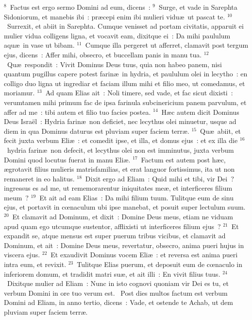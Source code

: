 ${}^{8}$~Factus est ergo sermo Domini ad eum, dicens~:
${}^{9}$~Surge, et vade in Sarephta Sidoniorum, et manebis ibi~: pr\ae cepi enim ibi mulieri vidu\ae\ ut pascat te.
${}^{10}$~Surrexit, et abiit in Sarephta. Cumque venisset ad portam civitatis, apparuit ei mulier vidua colligens ligna, et vocavit eam, dixitque ei~: Da mihi paululum aqu\ae\ in vase ut bibam.
${}^{11}$~Cumque illa pergeret ut afferret, clamavit post tergum ejus, dicens~: Affer mihi, obsecro, et buccellam panis in manu tua.
${}^{12}$~Qu\ae\ respondit~: Vivit Dominus Deus tuus, quia non habeo panem, nisi quantum pugillus capere potest farin\ae\ in hydria, et paululum olei in lecytho~: en colligo duo ligna ut ingrediar et faciam illum mihi et filio meo, ut comedamus, et moriamur.
${}^{13}$~Ad quam Elias ait~: Noli timere, sed vade, et fac sicut dixisti~: verumtamen mihi primum fac de ipsa farinula subcinericium panem parvulum, et affer ad me~: tibi autem et filio tuo facies postea.
${}^{14}$~H\ae c autem dicit Dominus Deus Isra\"el~: Hydria farin\ae\ non deficiet, nec lecythus olei minuetur, usque ad diem in qua Dominus daturus est pluviam super faciem terr\ae .
${}^{15}$~Qu\ae\ abiit, et fecit juxta verbum Eli\ae~: et comedit ipse, et illa, et domus ejus~: et ex illa die
${}^{16}$~hydria farin\ae\ non defecit, et lecythus olei non est imminutus, juxta verbum Domini quod locutus fuerat in manu Eli\ae .
${}^{17}$~Factum est autem post h\ae c, \ae grotavit filius mulieris matrisfamilias, et erat languor fortissimus, ita ut non remaneret in eo halitus.
${}^{18}$~Dixit ergo ad Eliam~: Quid mihi et tibi, vir Dei~? ingressus es ad me, ut rememorarentur iniquitates me\ae , et interficeres filium meum~?
${}^{19}$~Et ait ad eam Elias~: Da mihi filium tuum. Tulitque eum de sinu ejus, et portavit in cœnaculum ubi ipse manebat, et posuit super lectulum suum.
${}^{20}$~Et clamavit ad Dominum, et dixit~: Domine Deus meus, etiam ne viduam apud quam ego utcumque sustentor, afflixisti ut interficeres filium ejus~?
${}^{21}$~Et expandit se, atque mensus est super puerum tribus vicibus, et clamavit ad Dominum, et ait~: Domine Deus meus, revertatur, obsecro, anima pueri hujus in viscera ejus.
${}^{22}$~Et exaudivit Dominus vocem Eli\ae~: et reversa est anima pueri intra eum, et revixit.
${}^{23}$~Tulitque Elias puerum, et deposuit eum de cœnaculo in inferiorem domum, et tradidit matri su\ae , et ait illi~: En vivit filius tuus.
${}^{24}$~Dixitque mulier ad Eliam~: Nunc in isto cognovi quoniam vir Dei es tu, et verbum Domini in ore tuo verum est.
~\lettrine[lines=10,image=true,loversize=0.05,lraise=-0.03]{P}{}ost dies multos factum est verbum Domini ad Eliam, in anno tertio, dicens~: Vade, et ostende te Achab, ut dem pluviam super faciem terr\ae .
